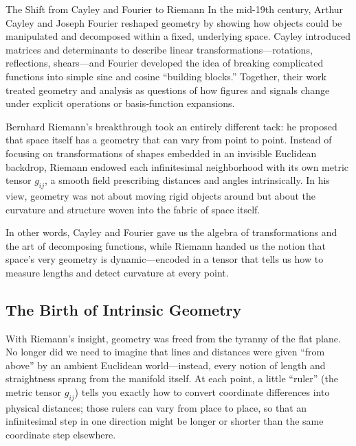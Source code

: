 \begin{HistoricalSidebar}{The Shift from Cayley and Fourier to Riemann}
In the mid-19th century, Arthur Cayley and Joseph Fourier reshaped geometry by showing how objects could be manipulated and decomposed within a fixed, underlying space.  Cayley introduced matrices and determinants to describe linear transformations—rotations, reflections, shears—and Fourier developed the idea of breaking complicated functions into simple sine and cosine “building blocks.”  Together, their work treated geometry and analysis as questions of how figures and signals change under explicit operations or basis‐function expansions.

\medskip

Bernhard Riemann’s breakthrough took an entirely different tack: he proposed that space itself has a geometry that can vary from point to point.  Instead of focusing on transformations of shapes embedded in an invisible Euclidean backdrop, Riemann endowed each infinitesimal neighborhood with its own metric tensor \(g_{ij}\), a smooth field prescribing distances and angles intrinsically.  In his view, geometry was not about moving rigid objects around but about the curvature and structure woven into the fabric of space itself.

\medskip

In other words, Cayley and Fourier gave us the algebra of transformations and the art of decomposing functions, while Riemann handed us the notion that space’s very geometry is dynamic—encoded in a tensor that tells us how to measure lengths and detect curvature at every point.  
\end{HistoricalSidebar}






\subsection{The Birth of Intrinsic Geometry}

With Riemann’s insight, geometry was freed from the tyranny of the flat plane.  No longer did we need to imagine that lines and distances were given “from above” by an ambient Euclidean world—instead, every notion of length and straightness sprang from the manifold itself.  At each point, a little “ruler” (the metric tensor \(g_{ij}\)) tells you exactly how to convert coordinate differences into physical distances; those rulers can vary from place to place, so that an infinitesimal step in one direction might be longer or shorter than the same coordinate step elsewhere.

